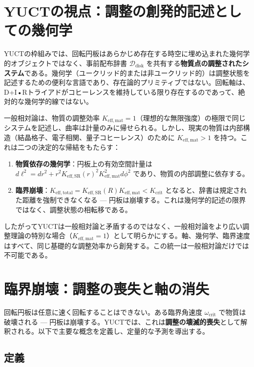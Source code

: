 \documentclass[12pt,a4paper]{article}
\newcommand{\Keffmat}{K_{\mathrm{eff,mat}}}
\newcommand{\Kefftot}{K_{\mathrm{eff,total}}}
\newcommand{\KeffSR}{K_{\mathrm{eff,SR}}}
\newcommand{\Kcrit}{K_{\mathrm{crit}}}
\begin{document}
	\section{YUCTの視点：調整の創発的記述としての幾何学}
	
	YUCTの枠組みでは、回転円板はあらかじめ存在する時空に埋め込まれた幾何学的オブジェクトではなく、事前配布辞書 \(\mathcal{D}_{\text{disk}}\) を共有する\textbf{物質点の調整されたシステム}である。幾何学（ユークリッド的または非ユークリッド的）は調整状態を記述するための便利な言語であり、存在論的プリミティブではない。回転軸は、D+I•Rトライアドがコヒーレンスを維持している限り存在するのであって、絶対的な幾何学的線ではない。
	
	一般相対論は、物質の調整効率 \(K_{\mathrm{eff,mat}} = 1\)（理想的な無限強度）の極限で同じシステムを記述し、曲率は計量のみに帰せられる。しかし、現実の物質は内部構造（結晶格子、電子相関、量子コヒーレンス）のために \(K_{\mathrm{eff,mat}} > 1\) を持つ。これは二つの決定的な帰結をもたらす：
	
	\begin{enumerate}
		\item \textbf{物質依存の幾何学}：円板上の有効空間計量は \(d\ell^2 = dr^2 + r^2 K_{\mathrm{eff,SR}}(r)^2 K_{\mathrm{eff,mat}}^2 d\phi^2\) であり、物質の内部調整に依存する。
		\item \textbf{臨界崩壊}：\(\Kefftot = \KeffSR(R) \Keffmat < \Kcrit\) となると、辞書は規定された距離を強制できなくなる — 円板は崩壊する。これは幾何学的記述の限界ではなく、調整状態の相転移である。
	\end{enumerate}
	
	したがってYUCTは一般相対論と矛盾するのではなく、一般相対論をより広い調整理論の特別な場合（\(\Keffmat=1\)）として明らかにする。軸、幾何学、臨界速度はすべて、同じ基礎的な調整効率から創発する。この統一は一般相対論だけでは不可能である。
	
	\section{臨界崩壊：調整の喪失と軸の消失}
	\label{sec:critical-disruption}
	
	回転円板は任意に速く回転することはできない。ある臨界角速度 \(\omega_{\text{crit}}\) で物質は破壊される — 円板は崩壊する。YUCTでは、これは\textbf{調整の壊滅的喪失}として解釈される。以下で主要な概念を定義し、定量的な予測を導出する。
	
	\subsection{定義}
	
\end{document}
